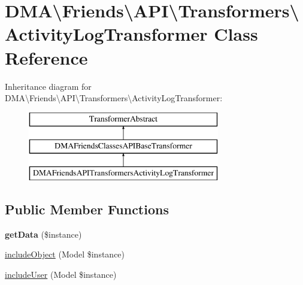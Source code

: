 \hypertarget{classDMA_1_1Friends_1_1API_1_1Transformers_1_1ActivityLogTransformer}{}\section{D\+M\+A\textbackslash{}Friends\textbackslash{}A\+P\+I\textbackslash{}Transformers\textbackslash{}Activity\+Log\+Transformer Class Reference}
\label{classDMA_1_1Friends_1_1API_1_1Transformers_1_1ActivityLogTransformer}
Inheritance diagram for D\+M\+A\textbackslash{}Friends\textbackslash{}A\+P\+I\textbackslash{}Transformers\textbackslash{}Activity\+Log\+Transformer\+:\begin{figure}[H]
\begin{center}
\leavevmode
\includegraphics[height=3.000000cm]{dd/dbd/classDMA_1_1Friends_1_1API_1_1Transformers_1_1ActivityLogTransformer}
\end{center}
\end{figure}
\subsection*{Public Member Functions}
\begin{DoxyCompactItemize}
\item 
\hypertarget{classDMA_1_1Friends_1_1API_1_1Transformers_1_1ActivityLogTransformer_ac409b7881bcd7d479b2876ea5fbaa6ed}{}{\bfseries get\+Data} (\$instance)\label{classDMA_1_1Friends_1_1API_1_1Transformers_1_1ActivityLogTransformer_ac409b7881bcd7d479b2876ea5fbaa6ed}

\item 
\hyperlink{classDMA_1_1Friends_1_1API_1_1Transformers_1_1ActivityLogTransformer_a700ebac47dfef9c1327212c904b7bdd4}{include\+Object} (Model \$instance)
\item 
\hyperlink{classDMA_1_1Friends_1_1API_1_1Transformers_1_1ActivityLogTransformer_abe5575182af5af066506991b5e2ab693}{include\+User} (Model \$instance)
\end{DoxyCompactItemize}
